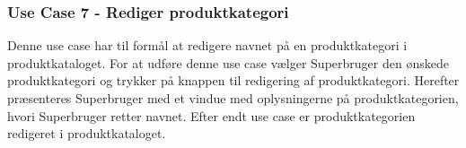 \subsubsection{Use Case 7 - Rediger produktkategori}
Denne use case har til formål at redigere navnet på en produktkategori i produktkataloget. For at udføre denne use case vælger Superbruger den ønskede produktkategori og trykker på knappen til redigering af produktkategori. Herefter præsenteres Superbruger med et vindue med oplysningerne på produktkategorien, hvori Superbruger retter navnet. Efter endt use case er produktkategorien redigeret i produktkataloget.